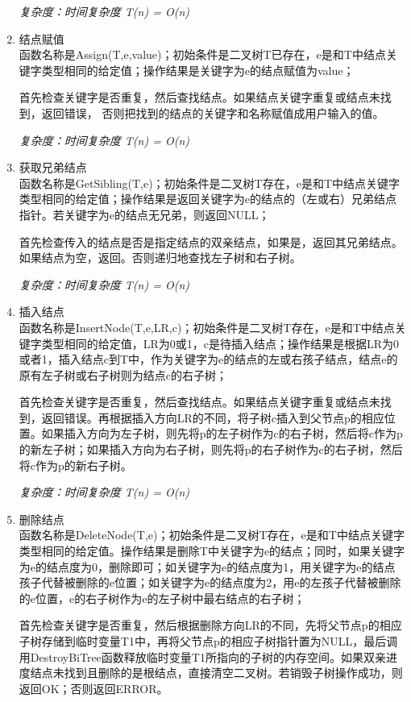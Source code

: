 \documentclass[supercite]{Experimental_Report}
\theoremstyle{definition}
\begin{document}
\begin{enumerate}
	\emph{复杂度：时间复杂度 T(n) = O(n)}
	
	\item 结点赋值\\
	函数名称是Assign(T,e,value)；初始条件是二叉树T已存在，e是和T中结点关键字类型相同的给定值；操作结果是关键字为e的结点赋值为value；
	
	首先检查关键字是否重复，然后查找结点。如果结点关键字重复或结点未找到，返回错误，
	否则把找到的结点的关键字和名称赋值成用户输入的值。
	
	\emph{复杂度：时间复杂度 T(n) = O(n)}
	\item 获取兄弟结点\\
	函数名称是GetSibling(T,e)；初始条件是二叉树T存在，e是和T中结点关键字类型相同的给定值；操作结果是返回关键字为e的结点的（左或右）兄弟结点指针。若关键字为e的结点无兄弟，则返回NULL；
	
	首先检查传入的结点是否是指定结点的双亲结点，如果是，返回其兄弟结点。如果结点为空，返回。否则递归地查找左子树和右子树。
	
	\emph{复杂度：时间复杂度 T(n) = O(n)}
	\item 插入结点\\
	函数名称是InsertNode(T,e,LR,c)；初始条件是二叉树T存在，e是和T中结点关键字类型相同的给定值，LR为0或1，c是待插入结点；操作结果是根据LR为0或者1，插入结点c到T中，作为关键字为e的结点的左或右孩子结点，结点e的原有左子树或右子树则为结点c的右子树；
	
	首先检查关键字是否重复，然后查找结点。如果结点关键字重复或结点未找到，返回错误。再根据插入方向LR的不同，将子树c插入到父节点p的相应位置。如果插入方向为左子树，则先将p的左子树作为c的右子树，然后将c作为p的新左子树；如果插入方向为右子树，则先将p的右子树作为c的右子树，然后将c作为p的新右子树。
	
	\emph{复杂度：时间复杂度 T(n) = O(n)}
	\item 删除结点\\
	函数名称是DeleteNode(T,e)；初始条件是二叉树T存在，e是和T中结点关键字类型相同的给定值。操作结果是删除T中关键字为e的结点；同时，如果关键字为e的结点度为0，删除即可；如关键字为e的结点度为1，用关键字为e的结点孩子代替被删除的e位置；如关键字为e的结点度为2，用e的左孩子代替被删除的e位置，e的右子树作为e的左子树中最右结点的右子树；
	
	首先检查关键字是否重复，然后根据删除方向LR的不同，先将父节点p的相应子树存储到临时变量T1中，再将父节点p的相应子树指针置为NULL，最后调用DestroyBiTree函数释放临时变量T1所指向的子树的内存空间。如果双亲进度结点未找到且删除的是根结点，直接清空二叉树。若销毁子树操作成功，则返回OK；否则返回ERROR。
	

\end{enumerate}
\end{document}
